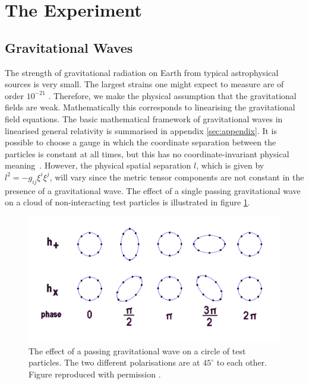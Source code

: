 \section{The Experiment}\label{sec:experiment}

\subsection{Gravitational Waves}

The strength of gravitational radiation on Earth from typical
astrophysical sources is very small. The largest strains one might
expect to measure are of order $10^{-21}$ \cite{hobson}. Therefore, we
make the physical assumption that the gravitational fields are
weak. Mathematically this corresponds to linearising the gravitational
field equations. The basic mathematical framework of gravitational
waves in linearised general relativity is summarised in appendix
\ref{sec:appendix}. It is possible to choose a gauge in which the
coordinate separation between the particles is constant at all times,
but this has no coordinate-invariant physical \mbox{meaning
\cite{hobson}}. However, the physical spatial separation $l$, which is
given by $l^2 = -g_{ij}\xi^i\xi^j$, will vary since the metric tensor
components are not constant in the presence of a gravitational
wave. The effect of a single passing gravitational wave on a cloud of
non-interacting test particles is illustrated in figure
\ref{fig:rings}.

\begin{figure}[htbp]
  \begin{center}
    \includegraphics[width=150mm]{Images/rings.pdf}
    \caption{\label{fig:rings} The effect of a passing gravitational
      wave on a circle of test particles. The two different
      polarisations are at $45^\circ$ to each other. Figure reproduced
      with permission \cite{rings}.}
  \end{center}
\end{figure}

